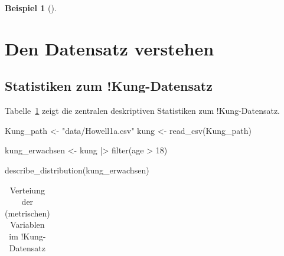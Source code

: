 \documentclass[
  ngerman,
  letterpaper,
  twoside,
  open=any]{scrbook}
\newenvironment{Shaded}{\begin{snugshade}}{\end{snugshade}}
\newcommand{\DecValTok}[1]{\textcolor[rgb]{0.68,0.00,0.00}{#1}}
\newcommand{\FunctionTok}[1]{\textcolor[rgb]{0.28,0.35,0.67}{#1}}
\newcommand{\NormalTok}[1]{\textcolor[rgb]{0.00,0.23,0.31}{#1}}
\newcommand{\OtherTok}[1]{\textcolor[rgb]{0.00,0.23,0.31}{#1}}
\newcommand{\SpecialCharTok}[1]{\textcolor[rgb]{0.37,0.37,0.37}{#1}}
\newcommand{\StringTok}[1]{\textcolor[rgb]{0.13,0.47,0.30}{#1}}
\theoremstyle{definition}
\newtheorem{example}{Beispiel}[chapter]
\theoremstyle{plain}
\theoremstyle{definition}
\theoremstyle{definition}
\theoremstyle{remark}
\begin{document}
\begin{example}[]
\section{Den Datensatz verstehen}\label{den-datensatz-verstehen}

\subsection{Statistiken zum
!Kung-Datensatz}\label{statistiken-zum-kung-datensatz}

Tabelle~\ref{tbl-kung1} zeigt die zentralen deskriptiven Statistiken zum
!Kung-Datensatz.

\begin{Shaded}
\begin{Highlighting}[]
\NormalTok{Kung\_path }\OtherTok{\textless{}{-}} \StringTok{"data/Howell1a.csv"}  
\NormalTok{kung }\OtherTok{\textless{}{-}} \FunctionTok{read\_csv}\NormalTok{(Kung\_path)  }

\NormalTok{kung\_erwachsen }\OtherTok{\textless{}{-}}\NormalTok{ kung }\SpecialCharTok{|\textgreater{}} \FunctionTok{filter}\NormalTok{(age }\SpecialCharTok{\textgreater{}} \DecValTok{18}\NormalTok{)}

\FunctionTok{describe\_distribution}\NormalTok{(kung\_erwachsen)}
\end{Highlighting}
\end{Shaded}

{

\begin{longtable}[]{@{}
  >{\raggedright\arraybackslash}p{}
  >{\centering\arraybackslash}p{}
  >{\centering\arraybackslash}p{}
  >{\centering\arraybackslash}p{}
  >{\centering\arraybackslash}p{}
  >{\centering\arraybackslash}p{}
  >{\centering\arraybackslash}p{}
  >{\centering\arraybackslash}p{}
  >{\centering\arraybackslash}p{}@{}}

\caption{\label{tbl-kung1}Verteiung der (metrischen) Variablen im
!Kung-Datensatz}

\tabularnewline


\end{longtable}}
\end{example}
\end{document}
